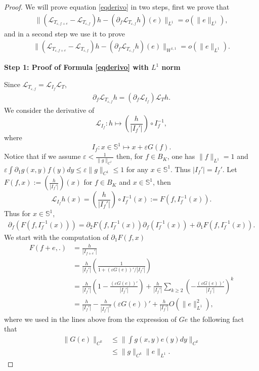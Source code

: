 \documentclass[12pt]{article}
\def\L{\mathcal{L}}
\newcommand{\eps}{\varepsilon}
\theoremstyle{plain}
\begin{document}
{\begin{proof}
We will prove equation \eqref{eqderivo} in two steps, first we prove that 
\begin{align*}
    \|(\L_{T_{\eps, f+e}}-\L_{T_{\eps, f}})h-(\partial_f\L_{T_{\eps, f}}h)(e)\|_{L^{1}}=o(\|e\|_{L^1}),
\end{align*}
 and in a second step we use it to prove
\begin{align*}
    \|(\L_{T_{\eps, f+e}}-\L_{T_{\eps, f}})h-(\partial_f\L_{T_{\eps, f}}h)(e)\|_{W^{1,1}}=o(\|e\|_{L^1}).
\end{align*}

\textbf{Step 1: Proof of Formula \eqref{eqderivo} with $L^1$ norm}

Since $\L_{T_{\eps, f}}=\L_{I_f}\L_{T}$,
\begin{align*}
    \partial_f \L_{T_{\eps, f}}h=(\partial_f \L_{I_f})\L_{T}h.
\end{align*}
We consider the derivative of 
$$\L_{I_f}: h \mapsto \left(\frac{h}{|I_f'|}\right)\circ I_f^{-1},$$
where
$$I_f: x\in \mathbb S^1 \mapsto x+ \eps G(f).$$ 
Notice that if we assume $\eps<\frac{1}{\|g\|_{C^1}}$ 
then, 
for $f\in B_K$, one has $\|f\|_{L^1}=1$  and $\eps \int \partial_1g(x,y)f(y)dy\leq \eps \|g\|_{C^1}\leq 1$ for any $x\in \mathbb S ^1$. Thus $|I_f'|=I_f'$.
Let $F(f,x):=(\frac{h}{|I_f'|})(x)$ for $f\in B_K$ and $x\in \mathbb S^1$, then
\begin{equation*}
    \L_{I_f}h(x)=(\frac{h}{|I_f'|})\circ I_f^{-1}(x):=F(f,I_f^{-1}(x)).
\end{equation*}
Thus for $x\in \mathbb S^1$,
\begin{align}
\label{fullderivF}
    \partial_f(F(f,I_f^{-1}(x)))=\partial_2 F(f,I_f^{-1}(x))\partial_f(I_f^{-1}(x))+\partial_1F(f,I_f^{-1}(x)).
\end{align}
We start with the computation of $\partial_1F(f,x)$ 
\begin{align*}
    F(f+e,.)&=\frac{h}{|I_{f+e}'|}\\
    &=\frac{h}{|I_{f}'|}\left(\frac{1}{1+(\eps G(e))'/|I_{f}'|}\right)\\
    &=\frac{h}{|I_{f}'|}\left(1-\frac{(\eps G(e))'}{|I_{f}'|}\right)+\frac{h}{|I_{f}'|}\sum_{k\geq 2} \left(-\frac{(\eps G(e))'}{|I_{f}'|}\right)^k\\
   &=\frac{h}{|I_{f}'|}-\frac{h}{|I_{f}'|^2}(\eps G(e))'+\frac{h}{|I_{f}'|}O(\|e\|_{L^1}^2),
\end{align*}
where we used in the lines above from the expression of $Ge$ the following fact that 
\begin{align}\label{eq:boundG}
\|G(e)\|_{C^k}&\leq \|\int g(x,y)e(y)dy\|_{C^{k}}\nonumber\\
&\leq \|g\|_{C^k}\|e\|_{L^1}.
\end{align}


\end{proof}}
\end{document}
